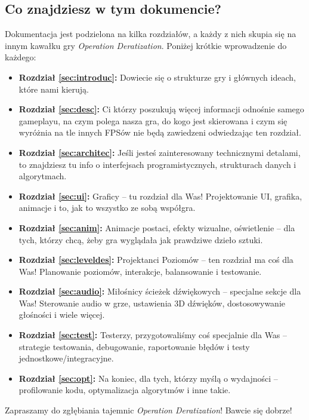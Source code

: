 \subsection{Co znajdziesz w tym dokumencie?}
Dokumentacja jest podzielona na kilka rozdziałów, a każdy z nich skupia się na innym kawałku gry \textit{Operation Deratization}. Poniżej krótkie wprowadzenie do każdego:
\begin{itemize}
\item \textbf{Rozdział \ref{sec:introduc}:} Dowiecie się o strukturze gry i głównych ideach, które nami kierują.
\item \textbf{Rozdział \ref{sec:desc}:} Ci którzy poszukują więcej informacji odnośnie samego gameplayu, na czym polega nasza gra, do kogo jest skierowana i czym się wyróżnia na tle innych FPSów nie będą zawiedzeni odwiedzając ten rozdział.
\item \textbf{Rozdział \ref{sec:architec}:} Jeśli jesteś zainteresowany technicznymi detalami, to znajdziesz tu info o interfejsach programistycznych, strukturach danych i algorytmach.
\item \textbf{Rozdział \ref{sec:ui}:} Graficy – tu rozdział dla Was! Projektowanie UI, grafika, animacje i to, jak to wszystko ze sobą współgra.
\item \textbf{Rozdział \ref{sec:anim}:} Animacje postaci, efekty wizualne, oświetlenie – dla tych, którzy chcą, żeby gra wyglądała jak prawdziwe dzieło sztuki.
\item \textbf{Rozdział \ref{sec:leveldes}:} Projektanci Poziomów – ten rozdział ma coś dla Was! Planowanie poziomów, interakcje, balansowanie i testowanie.
\item \textbf{Rozdział \ref{sec:audio}:} Miłośnicy ścieżek dźwiękowych – specjalne sekcje dla Was! Sterowanie audio w grze, ustawienia 3D dźwięków, dostosowywanie głośności i wiele więcej.
\item \textbf{Rozdział \ref{sec:test}:} Testerzy, przygotowaliśmy coś specjalnie dla Was – strategie testowania, debugowanie, raportowanie błędów i testy jednostkowe/integracyjne.
\item \textbf{Rozdział \ref{sec:opt}:} Na koniec, dla tych, którzy myślą o wydajności – profilowanie kodu, optymalizacja algorytmów i inne takie.
\end{itemize}

Zapraszamy do zgłębiania tajemnic \textit{Operation Deratization}! Bawcie się dobrze!